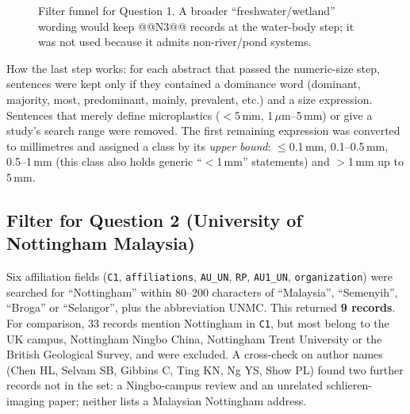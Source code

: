 \documentclass[11pt,a4paper]{article}
\newcommand{\um}{\,\ensuremath{\mu}m}
\begin{document}
\begin{figure}[H]\centering
{}
\caption{Filter funnel for Question 1. A broader ``freshwater/wetland'' wording would keep @@N3@@ records at the water-body step; it was not used because it admits non-river/pond systems.}
\end{figure}

How the last step works: for each abstract that passed the numeric-size step, sentences were kept only if they contained a dominance word (dominant, majority, most, predominant, mainly, prevalent, etc.) and a size expression. Sentences that merely define microplastics ($<$5\,mm, 1\um--5\,mm) or give a study's search range were removed. The first remaining expression was converted to millimetres and assigned a class by its \emph{upper bound}: $\le$0.1\,mm, 0.1--0.5\,mm, 0.5--1\,mm (this class also holds generic ``$<$1\,mm'' statements) and $>$1\,mm up to 5\,mm.

\subsection{Filter for Question 2 (University of Nottingham Malaysia)}
Six affiliation fields (\texttt{C1}, \texttt{affiliations}, \texttt{AU\_UN}, \texttt{RP}, \texttt{AU1\_UN}, \texttt{organization}) were searched for ``Nottingham'' within 80--200 characters of ``Malaysia'', ``Semenyih'', ``Broga'' or ``Selangor'', plus the abbreviation UNMC. This returned \textbf{9 records}. For comparison, 33 records mention Nottingham in \texttt{C1}, but most belong to the UK campus, Nottingham Ningbo China, Nottingham Trent University or the British Geological Survey, and were excluded. A cross-check on author names (Chen HL, Selvam SB, Gibbins C, Ting KN, Ng YS, Show PL) found two further records not in the set: a Ningbo-campus review and an unrelated schlieren-imaging paper; neither lists a Malaysian Nottingham address.
\end{document}
